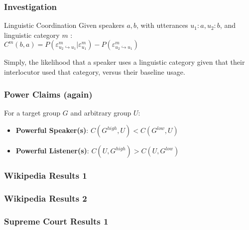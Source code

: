 \documentclass{beamer}
\begin{document}
\begin{frame}
\frametitle{Investigation}
\begin{block}{Linguistic Coordination}
Given speakers $a, b$, with utterances $u_1 : a, u_2 : b$, and linguistic category $m$ : \\
$C^m(b,a) = P(\varepsilon^{m}_{u_2 \hookrightarrow u_1}|\varepsilon^{m}_{u_1}) - P(\varepsilon^{m}_{u_2 \hookrightarrow u_1})$
\end{block}
Simply, the likelihood that a speaker uses a linguistic category given that their interlocutor used that category, versus their baseline usage.
\end{frame}
\begin{frame}
\frametitle{Power Claims (again)}
For a target group $G$ and arbitrary group $U$:\\
\begin{itemize}
	\item \textbf{Powerful Speaker(s)}: $C(G^{high}, U) < C(G^{low}, U)$
	\item \textbf{Powerful Listener(s)}: $C(U, G^{high}) > C(U, G^{low})$
\end{itemize}
\end{frame}
\begin{frame}
\frametitle{Wikipedia Results 1}
\begin{figure}
\end{figure}
\end{frame}
\begin{frame}
\frametitle{Wikipedia Results 2}
\begin{figure}
\end{figure}
\end{frame}
\begin{frame}
\frametitle{Supreme Court Results 1}
\begin{figure}
\end{figure}
\end{frame}
\end{document}
